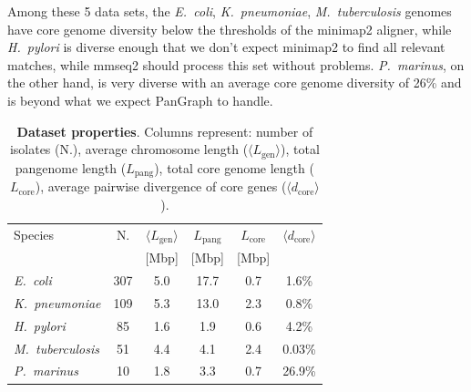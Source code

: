 \documentclass[aps,rmp,reprint,superscriptaddress,notitlepage,10pt]{revtex4-1}
\newcommand{\avg}[1]{\langle #1 \rangle}
\newcommand{\Lcore}{L_\text{core}}
\newcommand{\Lpang}{L_\text{pang}}
\newcommand{\Lgen}{L_\text{gen}}
\newcommand{\dcore}{\langle d_\text{core} \rangle}
\begin{document}
Among these 5 data sets, the \textit{E.~coli}, \textit{K.~pneumoniae}, \textit{M.~tuberculosis} genomes have core genome diversity below the thresholds of the minimap2 aligner, while \textit{H.~pylori} is diverse enough that we don't expect minimap2 to find all relevant matches, while mmseq2 should process this set without problems.
\textit{P.~marinus}, on the other hand, is very diverse with an average core genome diversity of 26\% and is beyond what we expect PanGraph to handle.




\begin{table}[h]
    \setlength{\tabcolsep}{6pt}
    \begin{tabular}{l c c c c c }
        \hline\hline
        Species                  & N.  & $\avg{\Lgen}$ & $\Lpang$ & $\Lcore$ & $\dcore$ \\
                                 &     & [Mbp]         & [Mbp]    & [Mbp]    &          \\
        \hline
        \textit{E.~coli}         & 307 & 5.0           & 17.7     & 0.7      & 1.6\%    \\
        \textit{K.~pneumoniae}   & 109 & 5.3           & 13.0     & 2.3      & 0.8\%    \\
        \textit{H.~pylori}       & 85  & 1.6           & 1.9      & 0.6      & 4.2\%    \\
        \textit{M.~tuberculosis} & 51  & 4.4           & 4.1      & 2.4      & 0.03\%   \\
        \textit{P.~marinus}      & 10  & 1.8           & 3.3      & 0.7      & 26.9\%   \\
        \hline
    \end{tabular}
    \caption{{\bf Dataset properties}. Columns represent:
        number of isolates (N.),
        average chromosome length ($\avg{\Lgen}$),
        total pangenome length ($\Lpang$),
        total core genome length ($\Lcore$),
        average pairwise divergence of core genes ($\dcore$).
    }
    \label{table:panx-dataset}
\end{table}
\end{document}
